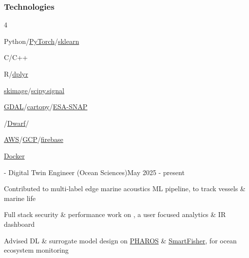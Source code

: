 \documentclass{article}
\newenvironment{mylist}[2]{
  \subsubsection*{#1}
  \begin{multicols}{#2}
  \small
  \begin{list}{}{}
   \setlength{\topsep}{0pt}
   \setlength{\itemsep}{1pt}
   \setlength{\parskip}{0pt}
   \setlength{\parsep}{0pt}}{\end{list}\end{multicols}\normalsize}
\newenvironment{**mylist}[2]{

\subsubsection*{#1\hfill#2}
  \small
  \begin{list}{}{}
    \setlength{\topsep}{.2pt}
   \setlength{\itemsep}{.8pt}
   \setlength{\parskip}{0pt}
   \setlength{\parsep}{0pt}}{\end{list}\normalsize}
\def\bsp{-.3in}
\begin{document}
\begin{mylist}{Technologies}{4}
\item Python/\href{https://pytorch.org/}{PyTorch}/\href{https://scikit-learn.org/stable/}{sklearn}
\item C/C++
\item R/\href{https://dplyr.tidyverse.org/}{dplyr}
\item \href{https://scikit-image.org/}{skimage}/\href{https://scipy.github.io/devdocs/reference/signal.html#module-scipy.signal}{scipy.signal}
\item \href{https://gdal.org/en/stable/}{GDAL}/\href{https://scitools.org.uk/cartopy/docs/latest/}{cartopy}/\href{https://step.esa.int/main/download/snap-download/}{ESA-SNAP}
\item \href{https://pypi.org/project/gtirb/}{}/\href{https://dwarfstd.org/}{Dwarf}/\href{https://pypi.org/project/asts/}{}
\item \href{https://aws.amazon.com/}{AWS}/\href{https://cloud.google.com/}{GCP}/\href{https://firebase.google.com/}{firebase}
\item \href{https://www.docker.com/}{Docker}
\end{mylist}

\newcommand{\BSec}[1]{
\noindent{\hspace{\bsp} \LARGE{\bf #1}{ }\hrulefill}}
\TabPositions{1.83in} %
\def\tabb{\tab- }  %

\BSec{}%
\begin{**mylist}{\href{https://blueoasis.pt/}{} \tabb Digital Twin Engineer (Ocean Sciences)}{May 2025 - present}
\item Contributed to multi-label edge marine acoustics ML pipeline, to track vessels \& marine life
\item Full stack security \& performance work on \href{https://hydrotwin.ai/}{}, a user focused analytics \& IR dashboard
\item Advised DL \& surrogate model design on \href{https://maritime-forum.ec.europa.eu/node/7693_en}{PHAROS} \& \href{https://blueoasis.pt/smartfisher/}{SmartFisher}, for ocean ecosystem monitoring 
\end{**mylist}
\end{document}
